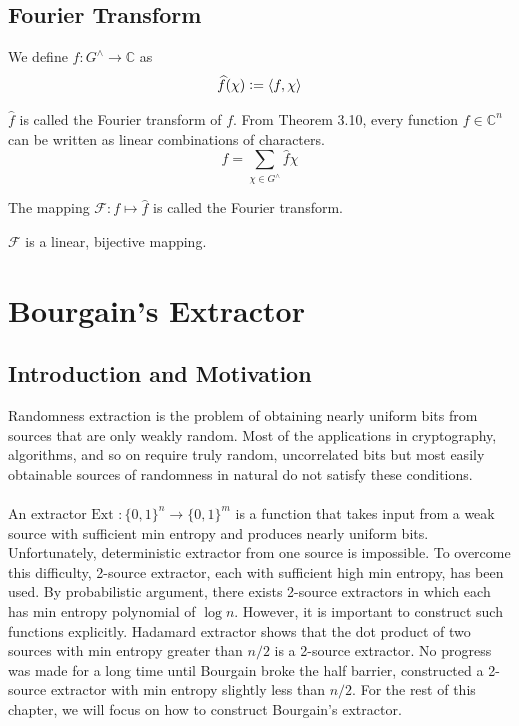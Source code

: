 \section{Fourier Transform}
\begin{definition}
We define $\widehat{f} : G^\land \rightarrow \mathbb{C}$ as
$$\widehat{f}(\chi) \vcentcolon= \langle f, \chi \rangle $$
\end{definition}
$\widehat{f}$ is called the Fourier transform of $f$.
From Theorem 3.10, every function $f \in \mathbb{C}^n$ can be written as linear combinations of characters. 
$$f = \sum\limits_{\chi \in G^\land} \widehat{f} \chi$$

\begin{definition}
The mapping $\mathcal{F} : f \mapsto \widehat{f}$ is called the Fourier transform. 
\end{definition}

\begin{prop}
$\mathcal{F}$ is a linear, bijective mapping. 
\end{prop}

\chapter{Bourgain's Extractor}

\section{Introduction and Motivation}

Randomness extraction is the problem of obtaining nearly uniform bits from sources that are 	only weakly random. Most of the applications in cryptography, algorithms, and so on require truly random, uncorrelated bits but most easily obtainable sources of randomness in natural do not satisfy these conditions. \\ \\
An extractor $\text{Ext } : \{ 0,1 \}^n \rightarrow \{0, 1 \} ^m$ is a function that takes input from a weak source with sufficient min entropy and produces nearly uniform bits. Unfortunately, deterministic extractor from one source is impossible. To overcome this difficulty, 2-source extractor, each with sufficient high min entropy, has been used. By probabilistic argument, there exists 2-source extractors in which each has min entropy polynomial of $\log n$. However, it is important to construct such functions explicitly. Hadamard extractor shows that the dot product of two sources with min entropy greater than $n/2$ is a 2-source extractor. No progress was made for a long time until Bourgain broke the half barrier, constructed a 2-source extractor with min entropy slightly less than $n/2$. For the rest of this chapter, we will focus on how to construct Bourgain's extractor.

